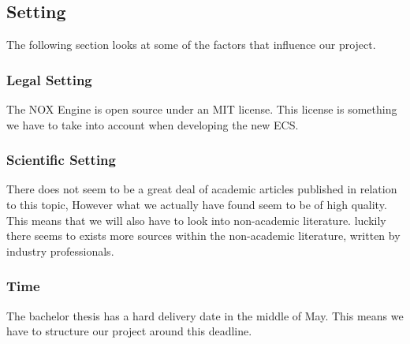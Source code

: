 \subsection{Setting}
The following section looks at some of the factors that influence our project.

\subsubsection{Legal Setting}
The NOX Engine is open source under an MIT license. 
This license is something we have to take into account when developing the new ECS.

\subsubsection{Scientific Setting}
There does not seem to be a great deal of academic articles published in relation to this topic,
However what we actually have found seem to be of high quality.
This means that we will also have to look into non-academic literature. 
luckily there seems to exists more sources within the non-academic literature, 
written by industry professionals.

\subsubsection{Time}
The bachelor thesis has a hard delivery date in the middle of May. 
This means we have to structure our project around this deadline.